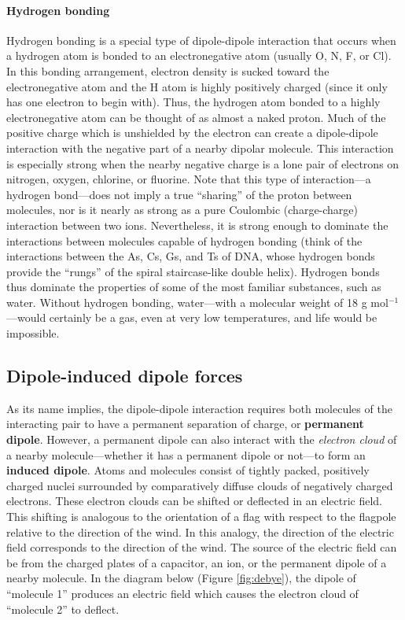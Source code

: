         \paragraph{Hydrogen bonding}
        Hydrogen bonding is a special type of dipole-dipole interaction that occurs when a hydrogen atom is bonded to an electronegative atom (usually O, N, F, or Cl). In this bonding arrangement, electron density is sucked toward the electronegative atom and the H atom is highly positively charged (since it only has one electron to begin with). Thus, the hydrogen atom bonded to a highly electronegative atom can be thought of as almost a naked proton. Much of the positive charge which is unshielded by the electron can create a dipole-dipole interaction with the negative part of a nearby dipolar molecule. This interaction is especially strong when the nearby negative charge is a lone pair of electrons on nitrogen, oxygen, chlorine, or fluorine. Note that this type of interaction---a hydrogen bond---does not imply a true ``sharing'' of the proton between molecules, nor is it nearly as strong as a pure Coulombic (charge-charge) interaction between two ions. Nevertheless, it is strong enough to dominate the interactions between molecules capable of hydrogen bonding (think of the interactions between the As, Cs, Gs, and Ts of DNA, whose hydrogen bonds provide the ``rungs'' of the spiral staircase-like double helix). Hydrogen bonds thus dominate the properties of some of the most familiar substances, such as water. Without hydrogen bonding, water---with a molecular weight of 18 g mol$^{-1}$---would certainly be a gas, even at very low temperatures, and life would be impossible.

    \subsection{Dipole-induced dipole forces} 

    As its name implies, the dipole-dipole interaction requires both molecules of the interacting pair to have a permanent separation of charge, or \textbf{permanent dipole}. However, a permanent dipole can also interact with the \textit{electron cloud} of a nearby molecule---whether it has a permanent dipole or not---to form an \textbf{induced dipole}. Atoms and molecules consist of tightly packed, positively charged nuclei surrounded by comparatively diffuse clouds of negatively charged electrons. These electron clouds can be shifted or deflected in an electric field. This shifting is analogous to the orientation of a flag with respect to the flagpole relative to the direction of the wind. In this analogy, the direction of the electric field corresponds to the direction of the wind. The source of the electric field can be from the charged plates of a capacitor, an ion, or the permanent dipole of a nearby molecule. In the diagram below (Figure \ref{fig:debye}), the dipole of ``molecule 1'' produces an electric field which causes the electron cloud of ``molecule 2'' to deflect. 

